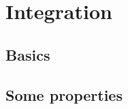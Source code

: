 \documentclass[main.tex]{subfiles}
\begin{document}
\section{Integration}
\begin{multicols}{2}
\subsection*{Basics}

\subsection*{Some properties}
\end{multicols}
\end{document}
